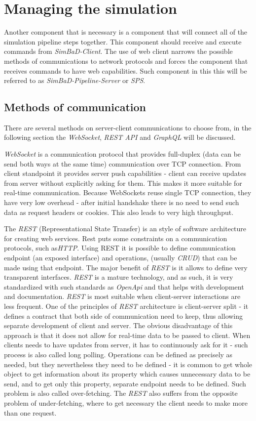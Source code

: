 \section{Managing the simulation}
Another component that is necessary is a component that will connect all of the simulation pipeline steps together. This component should receive and execute commands from \textit{SimBaD-Client}. The use of web client narrows the possible methods of communications to network protocols and forces the component that receives commands to have web capabilities. Such component in this this will be referred to as \textit{SimBaD-Pipeline-Server} or \textit{SPS}. 
\subsection{Methods of communication}
There are several methods on server-client communications to choose from, in the following section the \textit{WebSocket}, \textit{REST API} and \textit{GraphQL} will be discussed.

\textit{WebSocket} is a communication protocol that provides full-duplex (data can be send both ways at the same time) communication over TCP connection. From client standpoint it provides server push capabilities - client can receive updates from server without explicitly asking for them. This makes it more suitable for real-time communication. Because WebSockets reuse single TCP connection, they have very low overhead - after initial handshake there is no need to send such data as request headers or cookies. This also leads to very high throughput. 

The \textit{REST} (Representational State Transfer) is an style of software architecture for creating web services. Rest puts some constraints on a communication protocols, such as\textit{HTTP}. Using REST it is possible to define communication endpoint (an exposed interface) and operations, (usually \textit{CRUD}) that can be made using that endpoint. The major benefit of \textit{REST} is it allows to define very transparent interfaces. \textit{REST} is a mature technology, and as such, it is very standardized with such standards as \textit{OpenApi} and that helps with development and documentation. \textit{REST} is most suitable when client-server interactions are less frequent. One of the principles of \textit{REST} architecture is client-server split - it defines a contract that both side of communication need to keep, thus allowing separate development of client and server. The obvious disadvantage of this approach is that it does not allow for real-time data to be passed to client. When clients needs to have updates from server, it has to continuously ask for it - such process is also called long polling. Operations can be defined as precisely as needed, but they nevertheless they need to be defined - it is common to get whole object to get information about its property which causes unnecessary data to be send, and to get only this property, separate endpoint needs to be defined. Such problem is also called over-fetching. The \textit{REST} also suffers from the opposite problem of under-fetching, where to get necessary the client needs to make more than one request.

